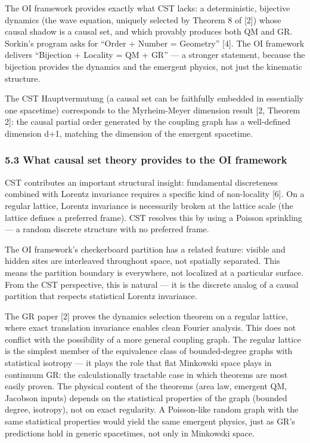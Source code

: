 \documentclass[
  11pt,
]{article}
\begin{document}
The OI framework provides exactly what CST lacks: a deterministic,
bijective dynamics (the wave equation, uniquely selected by Theorem 8 of
{[}2{]}) whose causal shadow is a causal set, and which provably
produces both QM and GR. Sorkin's program asks for ``Order + Number =
Geometry'' {[}4{]}. The OI framework delivers ``Bijection + Locality =
QM + GR'' --- a stronger statement, because the bijection provides the
dynamics and the emergent physics, not just the kinematic structure.

The CST Hauptvermutung (a causal set can be faithfully embedded in
essentially one spacetime) corresponds to the Myrheim-Meyer dimension
result {[}2, Theorem 2{]}: the causal partial order generated by the
coupling graph has a well-defined dimension d+1, matching the dimension
of the emergent spacetime.

\hypertarget{what-causal-set-theory-provides-to-the-oi-framework}{%
\subsubsection{5.3 What causal set theory provides to the OI
framework}\label{what-causal-set-theory-provides-to-the-oi-framework}}

CST contributes an important structural insight: fundamental
discreteness combined with Lorentz invariance requires a specific kind
of non-locality {[}6{]}. On a regular lattice, Lorentz invariance is
necessarily broken at the lattice scale (the lattice defines a preferred
frame). CST resolves this by using a Poisson sprinkling --- a random
discrete structure with no preferred frame.

The OI framework's checkerboard partition has a related feature: visible
and hidden sites are interleaved throughout space, not spatially
separated. This means the partition boundary is everywhere, not
localized at a particular surface. From the CST perspective, this is
natural --- it is the discrete analog of a causal partition that
respects statistical Lorentz invariance.

The GR paper {[}2{]} proves the dynamics selection theorem on a regular
lattice, where exact translation invariance enables clean Fourier
analysis. This does not conflict with the possibility of a more general
coupling graph. The regular lattice is the simplest member of the
equivalence class of bounded-degree graphs with statistical isotropy ---
it plays the role that flat Minkowski space plays in continuum GR: the
calculationally tractable case in which theorems are most easily proven.
The physical content of the theorems (area law, emergent QM, Jacobson
inputs) depends on the statistical properties of the graph (bounded
degree, isotropy), not on exact regularity. A Poisson-like random graph
with the same statistical properties would yield the same emergent
physics, just as GR's predictions hold in generic spacetimes, not only
in Minkowski space.
\end{document}
